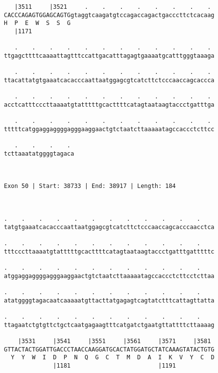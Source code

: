 \documentclass{article}
\begin{document}
\begin{Verbatim}
   |3511     |3521     .    .    .    .    .    .    .    . 
CACCCAGAGTGGAGCAGTGgtaggtcaagatgtccagaccagactgacccttctcacaag
H  P  E  W  S  S  G                                         
   |1171                                                    
  
   .    .    .    .    .    .    .    .    .    .    .    . 
ttgagcttttcaaaattagtttccattgacatttagagtgaaaatgcatttgggtaaaga
                                                            
   .    .    .    .    .    .    .    .    .    .    .    . 
ttacattatgtgaaatcacacccaattaatggagcgtcatcttctcccaaccagcaccca
                                                            
   .    .    .    .    .    .    .    .    .    .    .    . 
acctcatttcccttaaaatgtatttttgcacttttcatagtaataagtaccctgatttga
                                                            
   .    .    .    .    .    .    .    .    .    .    .    . 
tttttcatggaggaggggagggaaggaactgtctaatcttaaaaatagccaccctcttcc
                                                            
   .    .    .    . 
tcttaaatatggggtagaca
                    
                    
 
Exon 50 | Start: 38733 | End: 38917 | Length: 184



.    .    .    .    .    .    .    .    .    .    .    .    
tatgtgaaatcacacccaattaatggagcgtcatcttctcccaaccagcacccaacctca
                                                            
.    .    .    .    .    .    .    .    .    .    .    .    
tttcccttaaaatgtatttttgcacttttcatagtaataagtaccctgatttgatttttc
                                                            
.    .    .    .    .    .    .    .    .    .    .    .    
atggaggaggggagggaaggaactgtctaatcttaaaaatagccaccctcttcctcttaa
                                                            
.    .    .    .    .    .    .    .    .    .    .    .    
atatggggtagacaatcaaaaatgttacttatgagagtcagtatctttcattagttatta
                                                            
.    .    .    .    .    .    .    .    .    .    .    .    
ttagaatctgtgttctgctcaatgagaagtttcatgatctgaatgttattttcttaaaag
                                                            
    |3531     |3541     |3551     |3561     |3571     |3581 
GTTACTACTGGATTGACCCTAACCAAGGATGCACTATGGATGCTATCAAAGTATACTGTG
  Y  Y  W  I  D  P  N  Q  G  C  T  M  D  A  I  K  V  Y  C  D
              |1181                         |1191           
  

\end{Verbatim}
\end{document}
